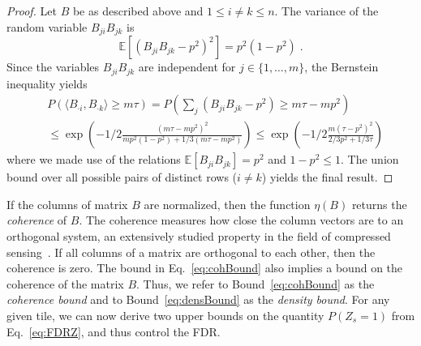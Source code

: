 \begin{proof}
Let $B$ be as described above and $1\leq i\neq k\leq n$. The variance of the random variable $B_{ji}B_{jk}$ is
\[\mathbb{E}\left[\left(B_{ji}B_{jk}-p^2\right)^2\right]=p^2(1-p^2)\;.\]
Since the variables $B_{ji}B_{jk}$ are independent for $j\in\{1,\ldots,m\}$, the Bernstein inequality yields 
\begin{align*}
&P(\langle B_{\cdot i},B_{\cdot k}\rangle\geq m\tau) 
=P\left(\sum_j (B_{j i}B_{j k}-p^2)\geq m\tau-mp^2\right)\\
&\leq \exp\left(-1/2 \frac{(m\tau-mp^2)^2}{mp^2(1-p^2)+1/3(m\tau-mp^2)}\right)
\leq \exp\left(-1/2 \frac{m(\tau-p^2)^2}{2/3p^2+1/3\tau}\right)
\end{align*}
where we made use of the relations $\mathbb{E}[B_{ji}B_{jk}]=p^2$ and $1-p^2\leq 1$.
The union bound over all possible pairs of distinct rows ($i\neq k$) yields the final result.
\end{proof}

If the columns of matrix $B$ are normalized, then the function $\eta(B)$ returns the \emph{coherence} of $B$. The coherence measures how close the column vectors are to an orthogonal system, an extensively studied property in the field of compressed sensing~\citep{foucart2013mathematical}. If all columns of a matrix are orthogonal to each other, then the coherence is zero. The bound in Eq.~\eqref{eq:cohBound} also implies a bound on the coherence of the matrix $B$. Thus, we refer to Bound~\eqref{eq:cohBound} as the \emph{coherence bound} and to Bound~\eqref{eq:densBound} as the \emph{density bound}. For any given tile, we can now derive two upper bounds on the quantity $P(Z_s=1)$ from Eq.~\eqref{eq:FDRZ}, and thus control the FDR.
